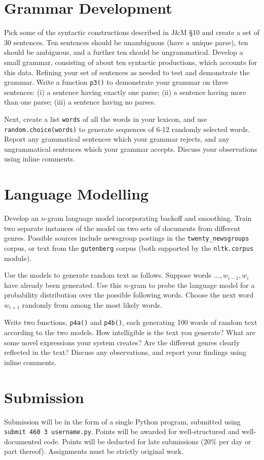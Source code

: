 \documentclass{460}
\begin{document}
\section{Grammar Development}

Pick some of the syntactic constructions described in J\&M \S 10 and
create a set of 30 sentences.  Ten sentences should be unambiguous
(have a unique parse), ten should be ambiguous, and a further ten
should be ungrammatical.  Develop a small grammar, consisting of about
ten syntactic productions, which accounts for this data.  Refining
your set of sentences as needed to test and demonstrate the grammar.
Write a function \texttt{p3()} to demonstrate your grammar on three
sentences: (i) a sentence having exactly one parse; (ii) a sentence
having more than one parse; (iii) a sentence having no parses.

Next, create a list \texttt{words} of all the words in your lexicon, and use
\texttt{random.choice(words)} to generate sequences of 6-12 randomly
selected words.  Report any grammatical sentences which your grammar
rejects, and any ungrammatical sentences which your grammar accepts.
Discuss your observations using inline comments.

\section{Language Modelling}

Develop an $n$-gram language model incorporating backoff and smoothing.
Train two separate instances of the model on two sets of documents from
different genres.  Possible sources include newsgroup postings in
the \texttt{twenty\_newsgroups} corpus, or text from the \texttt{gutenberg}
corpus (both supported by the \texttt{nltk.corpus} module).

Use the models to generate random text as follows.  Suppose words
$..., w_{i-1}, w_{i}$ have already been generated.  Use this $n$-gram
to probe the language model for a probability distribution over the
possible following words.  Choose the next word $w_{i+1}$ randomly from
among the most likely words.

Write two functions, \texttt{p4a()} and \texttt{p4b()}, each
generating 100 words of random text according to the two models.  How
intelligible is the text you generate?  What are some novel
expressions your system creates?  Are the different genres clearly
reflected in the text?  Discuss any observations, and report your
findings using inline comments.

\section*{Submission}

Submission will be in the form of a single Python program, submitted
using \texttt{submit 460 3 username.py}.  Points will be awarded for
well-structured and well-documented code.  Points will be deducted for
late submissions (20\% per day or part thereof).  Assignments must be
strictly original work.
\end{document}
